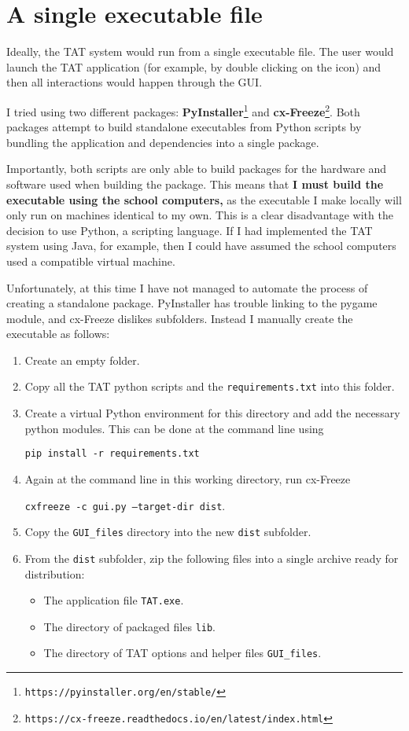 \documentclass[10pt]{article}
\begin{document}
\section{A single executable file} \label{executable}

Ideally, the TAT system would run from a single executable file. The user would launch the TAT application (for example, by double clicking on the icon) and then all interactions would happen through the GUI. 

I tried using two different packages: \textbf{PyInstaller}\footnote{\texttt{https://pyinstaller.org/en/stable/}} and \textbf{cx-Freeze}\footnote{\texttt{https://cx-freeze.readthedocs.io/en/latest/index.html}}. Both packages attempt to build standalone executables from Python scripts by bundling the application and dependencies into a single package. 

Importantly, both scripts are only able to build packages for the hardware and software used when building the package. This means that \textbf{I must build the executable using the school computers,} as the executable I make locally will only run on machines identical to my own. This is a clear disadvantage with the decision to use Python, a scripting language. If I had implemented the TAT system using Java, for example, then I could have assumed the school computers used a compatible virtual machine.

Unfortunately, at this time I have not managed to automate the process of creating a standalone package. PyInstaller has trouble linking to the pygame module, and cx-Freeze dislikes subfolders. Instead I manually create the executable as follows:

\begin{enumerate}
\item Create an empty folder.
\item Copy all the TAT python scripts and the \texttt{requirements.txt} into this folder.
\item Create a virtual Python environment for this directory and add the necessary python modules. This can be done at the command line using

\texttt{pip install -r requirements.txt}

\item Again at the command line in this working directory, run cx-Freeze

\texttt{cxfreeze -c gui.py --target-dir dist}.

\item Copy the \texttt{GUI\_files} directory into the new \texttt{dist} subfolder.
\item From the \texttt{dist} subfolder, zip the following files into a single archive ready for distribution:
\begin{itemize}
\item The application file \texttt{TAT.exe}.
\item The directory of packaged files \texttt{lib}.
\item The directory of TAT options and helper files \texttt{GUI\_files}.
\end{itemize}
\end{enumerate}
\end{document}
